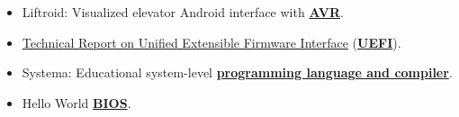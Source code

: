 \documentclass[letterpaper]{twentysecondcv} %
\begin{document}
\begin{itemize}
{          for OS course at Alexandria University.}
    \item{Liftroid: Visualized elevator Android interface with \textbf{\underline{AVR}}.}
    \item{\href{https://github.com/iocoder/uefi_report/raw/master/final_report.pdf}{Technical Report on Unified Extensible Firmware Interface}
          (\textbf{\underline{UEFI}}).}
    \item{Systema: Educational system-level \textbf{\underline{programming language and compiler}}.}
    \item{Hello World \textbf{\underline{BIOS}}.}
\end{itemize}


%

\end{document}
